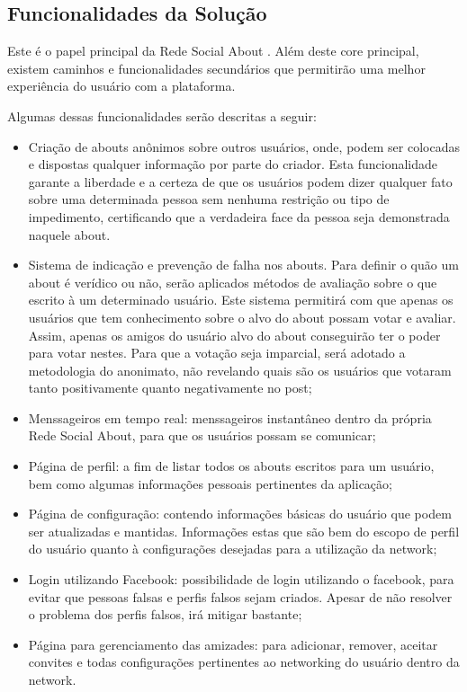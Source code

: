 \subsection{Funcionalidades da Solução}
\label{sub:propostadesolucao}
Este é o papel principal da Rede Social About . Além deste core principal, existem caminhos e funcionalidades
secundários  que permitirão uma melhor experiência do usuário com a plataforma.

Algumas dessas funcionalidades serão descritas a seguir:

\begin{itemize}
    \item Criação de abouts anônimos sobre outros usuários, onde, podem ser colocadas e dispostas
        qualquer informação por parte do criador. Esta funcionalidade garante a liberdade
        e a certeza de que os usuários podem dizer qualquer fato sobre uma determinada pessoa
        sem nenhuma restrição ou tipo de impedimento, certificando que a verdadeira
        face da pessoa seja demonstrada naquele about.
    \item Sistema de indicação e prevenção de falha nos abouts. Para definir o quão um about é
        verídico ou não, serão aplicados métodos de avaliação sobre o que escrito
        à um determinado usuário. Este sistema permitirá com que apenas os usuários que tem
        conhecimento sobre o alvo do about possam votar e avaliar. Assim, apenas
        os amigos do usuário alvo do about conseguirão ter o poder para votar nestes.
        Para que a votação seja imparcial, será adotado a metodologia do anonimato,
        não revelando quais são os usuários que votaram tanto positivamente quanto negativamente
        no post;
    \item Menssageiros em tempo real: menssageiros instantâneo dentro da própria Rede Social About, para que os usuários possam se
        comunicar;
    \item Página de perfil: a fim de listar todos os abouts escritos para um usuário, bem como algumas informações
        pessoais pertinentes da aplicação;
    \item Página de configuração: contendo informações básicas do usuário que podem ser atualizadas e mantidas.
        Informações estas que são bem do escopo de perfil do usuário quanto à configurações desejadas
        para a utilização da network;
    \item Login utilizando Facebook: possibilidade de login utilizando o facebook, para evitar que pessoas
        falsas e perfis falsos sejam criados. Apesar de não resolver o problema dos perfis falsos,
        irá mitigar bastante;
    \item Página para gerenciamento das amizades: para adicionar, remover, aceitar convites e todas configurações
        pertinentes ao networking do usuário dentro da network.
\end{itemize}

